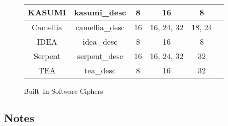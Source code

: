 \documentclass[synpaper]{book}
\begin{document}
\begin{figure}[hpbt]
\begin{small}
\begin{center}
\begin{tabular}{|c|c|c|c|c|c|}
     \hline KASUMI & kasumi\_desc & 8 & 16 & 8 \\
     \hline Camellia & camellia\_desc & 16 & 16, 24, 32 & 18, 24 \\
     \hline IDEA & idea\_desc & 8 & 16 & 8 \\
     \hline Serpent & serpent\_desc & 16 & 16, 24, 32 & 32 \\
     \hline TEA & tea\_desc & 8 & 16 & 32 \\
     \hline
\end{tabular}
\end{center}
\end{small}
\caption{Built--In Software Ciphers}
\end{figure}

\subsection{Notes}
\end{document}
